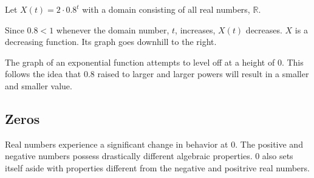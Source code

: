\documentclass{ximera}
\begin{document}
\begin{example}

Let $X(t) = 2 \cdot 0.8^t$ with a domain consisting of all real numbers, $\mathbb{R}$.


Since $0.8 < 1$ whenever the domain number, $t$, increases, $X(t)$ decreases.  $X$ is a decreasing function.  Its graph goes downhill to the right.









\begin{image}
\end{image}






\end{example}

The graph of an exponential function attempts to level off at a height of $0$.  This follows the idea that $0.8$ raised to larger and larger powers will result in a smaller and smaller value.












\subsection{Zeros}

Real numbers experience a significant change in behavior at $0$.  The positive and negative numbers possess drastically different algebraic properties.  $0$ also sets itself aside with properties different from the negative and positrive real numbers.
\end{document}
